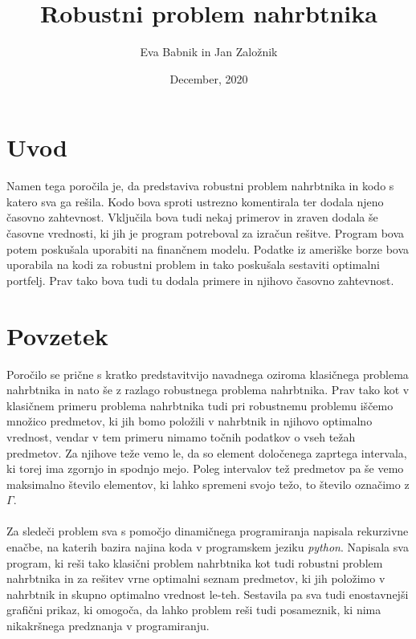 \documentclass[a4paper,12pt]{article}
\theoremstyle{definition}
\begin{document}
\title{Robustni problem nahrbtnika}
\author{Eva Babnik in Jan Založnik}
\date{December, 2020}
\maketitle


\newpage
\tableofcontents
\listoffigures
\listoftables
\newpage
\section{Uvod}
\medskip
Namen tega poročila je, da predstaviva robustni problem nahrbtnika in kodo s katero sva ga rešila. Kodo bova sproti 
ustrezno komentirala ter dodala njeno časovno zahtevnost. Vključila bova tudi nekaj primerov in zraven dodala še časovne vrednosti, ki jih je program
potreboval za izračun rešitve. Program bova potem poskušala uporabiti na finančnem modelu. Podatke iz ameriške borze bova
uporabila na kodi za robustni problem in tako poskušala sestaviti optimalni portfelj. Prav tako bova tudi tu dodala primere in 
njihovo časovno zahtevnost.

\section{Povzetek}
\medskip
Poročilo se prične s kratko predstavitvijo navadnega oziroma klasičnega problema nahrbtnika in nato še z razlago 
robustnega problema nahrbtnika. Prav tako kot v klasičnem primeru problema nahrbtnika tudi pri robustnemu problemu iščemo 
množico predmetov, ki jih bomo položili v nahrbtnik in njihovo optimalno vrednost, vendar v tem primeru nimamo točnih podatkov o 
vseh težah predmetov. Za njihove teže vemo le, da so element določenega zaprtega intervala, ki torej ima zgornjo in spodnjo mejo.
Poleg intervalov tež predmetov pa še vemo maksimalno število elementov, ki lahko spremeni svojo težo, to število označimo z $\Gamma$.
\paragraph{}
Za sledeči problem sva s pomočjo dinamičnega programiranja napisala rekurzivne enačbe, na katerih bazira
najina koda v programskem jeziku \textit{python}. Napisala sva program, ki reši tako klasični problem nahrbtnika kot 
tudi robustni problem nahrbtnika in za rešitev vrne optimalni seznam predmetov, ki jih položimo v nahrbtnik in skupno 
optimalno vrednost le-teh. Sestavila pa sva tudi enostavnejši grafični prikaz, ki omogoča, da lahko problem reši tudi posameznik, 
ki nima nikakršnega predznanja v programiranju.
\end{document}
